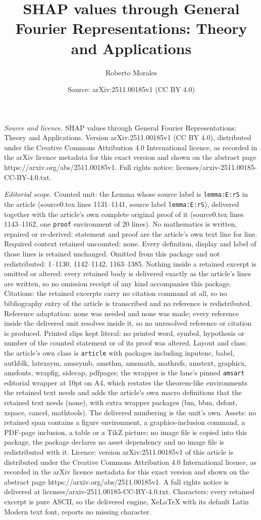 \documentclass[10pt,a4paper]{amsart}
\title[SHAP values through General Fourier Representations: Theory ]{SHAP values through General Fourier Representations: Theory and Applications}
\author{Roberto Morales}
\date{Source: arXiv:2511.00185v1 (CC BY 4.0)}
\begin{document}
\maketitle

\noindent\emph{Source and licence.} SHAP values through General Fourier Representations: Theory and Applications. Version arXiv:2511.00185v1 (CC BY 4.0), distributed under the Creative Commons Attribution 4.0 International licence, as recorded in the arXiv licence metadata for this exact version and shown on the abstract page https://arxiv.org/abs/2511.00185v1. Full rights notice: licenses/arxiv-2511.00185-CC-BY-4.0.txt.\par\smallskip

\noindent\textit{Editorial scope.} Counted unit: the Lemma whose source label is \texttt{lemma:E:rS} in the article (source0.tex lines 1131--1141, source label \texttt{lemma:E:rS}), delivered together with the article's own complete original proof of it (source0.tex lines 1143--1162, one \texttt{proof} environment of 20 lines). No mathematics is written, repaired or re-derived: statement and proof are the article's own text line for line. Required context retained uncounted: none. Every definition, display and label of those lines is retained unchanged. Omitted from this package and not redistributed: 1--1130, 1142--1142, 1163--1385. Nothing inside a retained excerpt is omitted or altered: every retained body is delivered exactly as the article's lines are written, so no omission receipt of any kind accompanies this package. Citations: the retained excerpts carry no citation command at all, so no bibliography entry of the article is transcribed and no reference is redistributed. Reference adaptation: none was needed and none was made; every reference inside the delivered unit resolves inside it, so no unresolved reference or citation is produced. Printed slips kept literal: no printed word, symbol, hypothesis or number of the counted statement or of its proof was altered. Layout and class: the article's own class is \texttt{article} with packages including inputenc, babel, authblk, latexsym, amssymb, amsthm, amsmath, mathrsfs, amstext, graphicx, amsfonts, wrapfig, sidecap, pdfpages; the wrapper is the lane's pinned \texttt{amsart} editorial wrapper at 10pt on A4, which restates the theorem-like environments the retained text needs and adds the article's own macro definitions that the retained text needs (none), with extra wrapper packages (bm, bbm, dsfont, xspace, cancel, mathtools). The delivered numbering is the unit's own. Assets: no retained span contains a figure environment, a graphics-inclusion command, a PDF-page inclusion, a table or a TikZ picture; no image file is copied into this package, the package declares no asset dependency and no image file is redistributed with it. Licence: version arXiv:2511.00185v1 of this article is distributed under the Creative Commons Attribution 4.0 International licence, as recorded in the arXiv licence metadata for this exact version and shown on the abstract page https://arxiv.org/abs/2511.00185v1. A full rights notice is delivered at licenses/arxiv-2511.00185-CC-BY-4.0.txt. Characters: every retained excerpt is pure ASCII, so the delivered engine, XeLaTeX with its default Latin Modern text font, reports no missing character.
\end{document}
